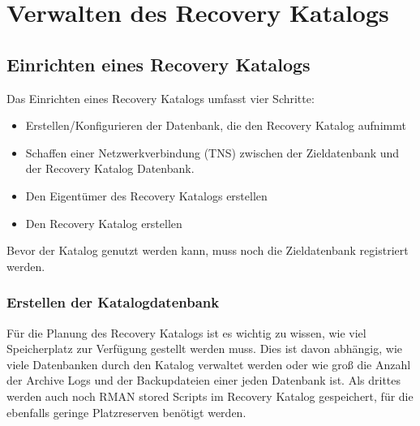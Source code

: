\chapter{Verwalten des Recovery Katalogs}
\chaptertoc{}
\cleardoubleevenpage

    \section{Einrichten eines Recovery Katalogs}
    \label{createrecoverycatalog}
      Das Einrichten eines Recovery Katalogs umfasst vier Schritte:
      \begin{itemize}
        \item Erstellen/Konfigurieren der Datenbank, die den Recovery Katalog aufnimmt
        \item Schaffen einer Netzwerkverbindung (TNS) zwischen der Zieldatenbank und der Recovery Katalog Datenbank.
        \item Den Eigentümer des Recovery Katalogs erstellen
        \item Den Recovery Katalog erstellen
      \end{itemize}
      Bevor der Katalog genutzt werden kann, muss noch die Zieldatenbank registriert werden.
      \subsection{Erstellen der Katalogdatenbank}
        Für die Planung des Recovery Katalogs ist es wichtig zu wissen, wie viel Speicherplatz zur Verfügung gestellt werden muss. Dies ist davon abhängig, wie viele Datenbanken durch den Katalog verwaltet werden oder wie groß die Anzahl der Archive Logs und der Backupdateien einer jeden Datenbank ist. Als drittes werden auch noch RMAN stored Scripts im Recovery Katalog gespeichert, für die ebenfalls geringe Platzreserven benötigt werden.

